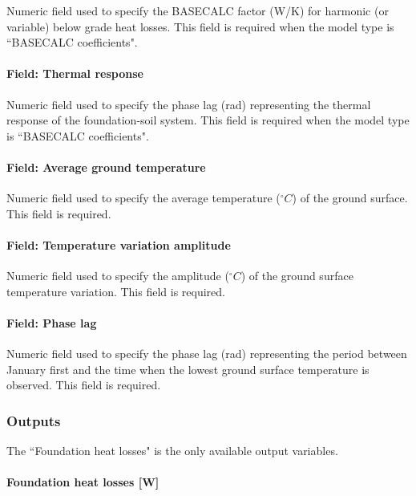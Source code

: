 Numeric field used to specify the BASECALC factor (W/K) for harmonic (or variable) below grade heat losses.  This field is required when the model type is ``BASECALC coefficients".

\paragraph{Field: Thermal response}\label{field-thermalresponse-basesimp}

Numeric field used to specify the phase lag (rad) representing the thermal response of the foundation-soil system.  This field is required when the model type is ``BASECALC coefficients".

\paragraph{Field: Average ground temperature}\label{field-averagegroundtemp-basesimp}

Numeric field used to specify the average temperature ($^{\circ}C$) of the ground surface.  This field is required.

\paragraph{Field: Temperature variation amplitude}\label{field-tempvariationampl-basesimp}

Numeric field used to specify the amplitude ($^{\circ}C$) of the ground surface temperature variation.  This field is required.

\paragraph{Field: Phase lag}\label{field-phaselag-basesimp}

Numeric field used to specify the phase lag (rad) representing the period between January first and the time when the lowest ground surface temperature is observed.  This field is required.

\subsubsection{Outputs}\label{outputs-basesimp}

The ``Foundation heat losses" is the only available output variables.

\paragraph{Foundation heat losses {[}W{]}}\label{BSFoundation-heat-losses-w}

